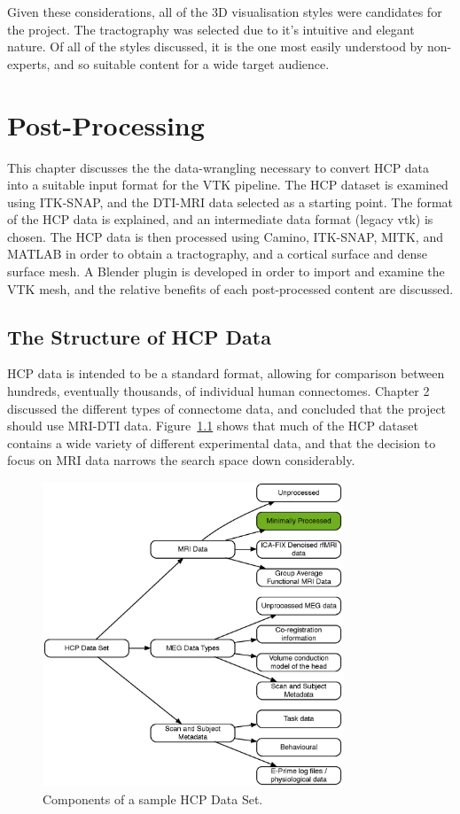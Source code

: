 \documentclass[MSc,paper=a4,pagesize=auto]{icldt}
\begin{document}
Given these considerations, all of the 3D visualisation styles were candidates for the project. The tractography was selected due to it's intuitive and elegant nature. Of all of the styles discussed, it is the one most easily understood by non-experts, and so suitable content for a wide target audience.

\chapter{Post-Processing}

This chapter discusses the the data-wrangling necessary to convert HCP data into a suitable input format for the VTK pipeline. The HCP dataset is examined using ITK-SNAP, and the DTI-MRI data selected as a starting point. The format of the HCP data is explained, and an intermediate data format (legacy vtk) is chosen. The HCP data is then processed using Camino, ITK-SNAP, MITK, and MATLAB in order to obtain a tractography, and a cortical surface and dense surface mesh. A Blender plugin is developed in order to import and examine the VTK mesh, and the relative benefits of each post-processed content are discussed.  


\section{The Structure of HCP Data} \label{sec:the_structure_of_hcp_data}
HCP data is intended to be a standard format, allowing for comparison between hundreds, eventually thousands, of individual human connectomes. Chapter 2 discussed the different types of connectome data, and concluded that the project should use MRI-DTI data. Figure~\ref{fig:hcp_full_data_set} shows that much of the HCP dataset contains a wide variety of different experimental data, and that the decision to focus on MRI data narrows the search space down considerably.

\begin{figure}[htbp!]
    \centering
    \includegraphics[width=0.8\textwidth]{resources/hcp_full_data_set}
    \caption{Components of a sample HCP Data Set.}
    \label{fig:hcp_full_data_set}
\end{figure}
\end{document}
